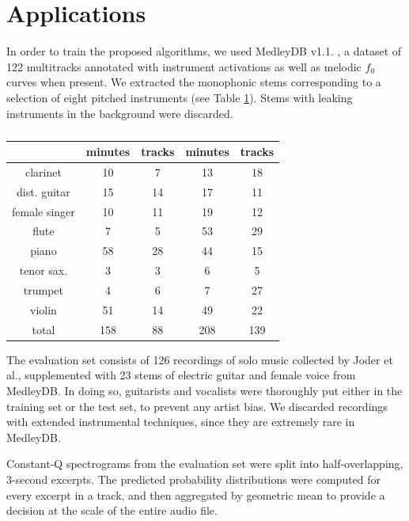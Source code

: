 \documentclass{article}
\makeatletter
\newcommand*{\etal}{et al.\@\xspace}
\makeatother
\begin{document}
\section{Applications}\label{sec:single-instrument}
In order to train the proposed algorithms, we used MedleyDB v1.1. \cite{Bittner2014}, a
dataset of 122 multitracks annotated with instrument activations as well as melodic $f_0$
curves when present. 
We extracted the monophonic stems corresponding to a selection of eight pitched
instruments (see Table \ref{table:single-label-durations}).
Stems with leaking instruments in the background were discarded.

\begin{table}
	\begin{center}
	\begin{tabular}{|c|cc|cc|}
		\hline
		& minutes & tracks & minutes & tracks \\
		\hline
		clarinet & 10 & 7 & 13 & 18 \\
		dist. guitar & 15 & 14 & 17 & 11 \\
		female singer & 10 & 11 & 19 & 12 \\
		flute & 7 & 5 & 53 & 29 \\
		piano & 58 & 28 & 44 & 15 \\
		tenor sax. & 3 & 3 & 6 & 5 \\
		trumpet & 4 & 6 & 7 & 27 \\
		violin & 51 & 14 & 49 & 22 \\
		\hline
		total & 158 & 88 & 208 & 139 \\
		\hline
	\end{tabular}
	\end{center}
	\caption{\label{table:single-label-durations}}
\end{table}

The evaluation set consists of 126 recordings of solo music collected by
Joder \etal \cite{Joder2009}, supplemented with
23 stems of electric guitar and female voice from MedleyDB.
In doing so, guitarists and vocalists were thoroughly put either in the training set or the test set,
to prevent any artist bias.
We discarded recordings with extended instrumental techniques, since they are
extremely rare in MedleyDB.

Constant-Q spectrograms from the evaluation set were split into half-overlapping,
3-second excerpts.
The predicted probability distributions were computed for every excerpt in a track,
and then aggregated by geometric mean to provide a decision at the scale of
the entire audio file.
\end{document}
